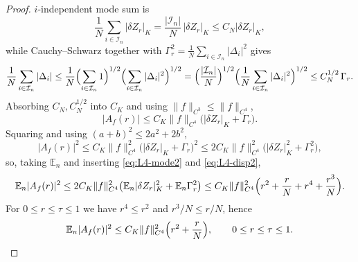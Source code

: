 \documentclass[a4paper,fleqn]{cas-sc}
\theoremstyle{definition}
\theoremstyle{remark}
\begin{document}
\begin{proof}
$i$-independent mode sum is
\[
\frac1N\sum_{i\in\mathcal I_n}|\delta Z_r|_K
=\frac{|\mathcal I_n|}N\,|\delta Z_r|_K
\le C_N|\delta Z_r|_K,
\]
while Cauchy--Schwarz together with $\Gamma_r^2=\frac1N\sum_{i\in\mathcal I_n}|\Delta_i|^2$ gives
\[
\frac1N\sum_{i\in\mathcal I_n}|\Delta_i|
\le\frac1N\Bigl(\sum_{i\in\mathcal I_n}1\Bigr)^{1/2}\Bigl(\sum_{i\in\mathcal I_n}|\Delta_i|^2\Bigr)^{1/2}
=\Bigl(\frac{|\mathcal I_n|}N\Bigr)^{1/2}\Bigl(\frac1N\sum_{i\in\mathcal I_n}|\Delta_i|^2\Bigr)^{1/2}
\le C_N^{1/2}\,\Gamma_r.
\]
Absorbing $C_N,C_N^{1/2}$ into $C_K$ and using $\|f\|_{C^3}\le\|f\|_{C^4}$,
\[
|A_f(r)|\le C_K\|f\|_{C^4}\bigl(|\delta Z_r|_K+\Gamma_r\bigr).
\]
Squaring and using $(a+b)^2\le2a^2+2b^2$,
\[
|A_f(r)|^2
\le C_K\|f\|_{C^4}^2\bigl(|\delta Z_r|_K+\Gamma_r\bigr)^2
\le 2C_K\|f\|_{C^4}^2\bigl(|\delta Z_r|_K^2+\Gamma_r^2\bigr),
\]
so, taking $\mathbb E_n$ and inserting \eqref{eq:L4-mode2} and \eqref{eq:L4-disp2},
\[
\mathbb E_n|A_f(r)|^2
\le 2C_K\|f\|_{C^4}^2\bigl(\mathbb E_n|\delta Z_r|_K^2+\mathbb E_n\Gamma_r^2\bigr)
\le C_K\|f\|_{C^4}^2\Bigl(r^2+\frac rN+r^4+\frac{r^3}N\Bigr).
\]
For $0\le r\le\tau\le1$ we have $r^4\le r^2$ and $r^3/N\le r/N$, hence
\begin{equation}\label{eq:L4-Af2}
\mathbb E_n|A_f(r)|^2\le C_K\|f\|_{C^4}^2\Bigl(r^2+\frac rN\Bigr),
\qquad 0\le r\le\tau\le1.
\end{equation}


\end{proof}
\end{document}
